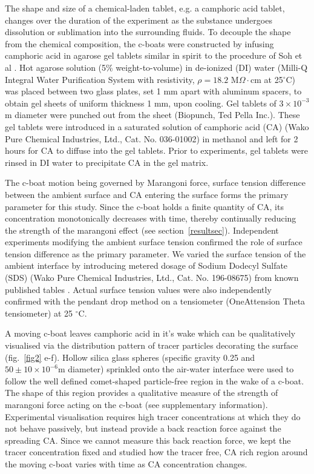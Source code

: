 \documentclass[journal=langd5, manuscript=article, layout=twocolumn]{achemso}
\begin{document}
The shape and size of a chemical-laden tablet, e.g. a camphoric acid tablet, changes over the duration of the experiment as the substance undergoes dissolution or sublimation into the surrounding fluids. 
To decouple the shape from the chemical composition, the c-boats were constructed by infusing camphoric acid in agarose gel tablets similar in spirit to the procedure of Soh et al \cite{Soh2008}. Hot agarose solution (5\% weight-to-volume) in de-ionized (DI) water (Milli-Q Integral Water Purification System with resistivity, $\rho=18.2$ M$\Omega\cdot$cm at 25$^{\circ}$C) was placed between two glass plates, set 1 mm apart with aluminum spacers, to obtain gel sheets of uniform thickness 1 mm, upon cooling. Gel tablets of $3 \times 10^{-3}$ m diameter were punched out from the sheet (Biopunch, Ted Pella Inc.). These gel tablets were introduced in a saturated solution of camphoric acid (CA) (Wako Pure Chemical Industries, Ltd., Cat. No. 036-01002) in methanol and left for 2 hours for CA to diffuse into the gel tablets. Prior to experiments, gel tablets were rinsed in DI water to precipitate CA in the gel matrix. 

The c-boat motion being governed by Marangoni force, surface tension difference between the ambient surface and CA entering the surface forms the primary parameter for this study. Since the c-boat holds a finite quantity of CA, its concentration monotonically decreases with time, thereby continually reducing the strength of the marangoni effect (see section~\ref{resultsec}). Independent experiments modifying the ambient surface tension confirmed the role of surface tension difference as the primary parameter. We varied the surface tension of the ambient interface by introducing metered dosage of Sodium Dodecyl Sulfate (SDS) (Wako Pure Chemical Industries, Ltd., Cat. No. 196-08675) from known published tables \cite{mysels1986}. Actual surface tension values were also independently confirmed with the pendant drop method on a tensiometer (OneAttension Theta tensiometer) at 25 $^{\circ}$C.

A moving c-boat leaves camphoric acid in it's wake which can be qualitatively visualised via the distribution pattern of tracer particles decorating the surface (fig.~\ref{fig2} e-f). Hollow silica glass spheres (specific gravity 0.25 and $50 \pm 10 \times 10^{-6}$m diameter) sprinkled onto the air-water interface were used to follow the well defined comet-shaped particle-free region in the wake of a c-boat. The shape of this region provides a qualitative measure of the strength of marangoni force acting on the c-boat (see supplementary information). Experimental visualisation requires high tracer concentrations at which they do not behave passively, but instead provide a back reaction force against the spreading CA. Since we cannot measure this back reaction force, we kept the tracer concentration fixed and studied how the tracer free, CA rich region around the moving c-boat varies with time as CA concentration changes.
\end{document}
